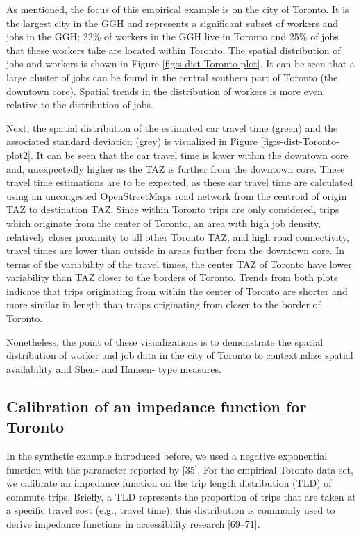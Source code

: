 \documentclass[10pt,letterpaper]{article}
\begin{document}
As mentioned, the focus of this empirical example is on the city of
Toronto. It is the largest city in the GGH and represents a significant
subset of workers and jobs in the GGH; 22\% of workers in the GGH live
in Toronto and 25\% of jobs that these workers take are located within
Toronto. The spatial distribution of jobs and workers is shown in Figure
\ref{fig:s-dist-Toronto-plot}. It can be seen that a large cluster of
jobs can be found in the central southern part of Toronto (the downtown
core). Spatial trends in the distribution of workers is more even
relative to the distribution of jobs.

Next, the spatial distribution of the estimated car travel time (green)
and the associated standard deviation (grey) is visualized in Figure
\ref{fig:s-dist-Toronto-plot2}. It can be seen that the car travel time
is lower within the downtown core and, unexpectedly higher as the TAZ is
further from the downtown core. These travel time estimations are to be
expected, as these car travel time are calculated using an uncongested
OpenStreetMaps road network from the centroid of origin TAZ to
destination TAZ. Since within Toronto trips are only considered, trips
which originate from the center of Toronto, an area with high job
density, relatively closer proximity to all other Toronto TAZ, and high
road connectivity, travel times are lower than outside in areas further
from the downtown core. In terms of the variability of the travel times,
the center TAZ of Toronto have lower variability than TAZ closer to the
borders of Toronto. Trends from both plots indicate that trips
originating from within the center of Toronto are shorter and more
similar in length than traips originating from closer to the border of
Toronto.

Nonetheless, the point of these visualizations is to demonstrate the
spatial distribution of worker and job data in the city of Toronto to
contextualize spatial availability and Shen- and Hansen- type measures.

\hypertarget{calibration-of-an-impedance-function-for-toronto}{%
\subsection{Calibration of an impedance function for
Toronto}\label{calibration-of-an-impedance-function-for-toronto}}

In the synthetic example introduced before, we used a negative
exponential function with the parameter reported by {[}35{]}. For the
empirical Toronto data set, we calibrate an impedance function on the
trip length distribution (TLD) of commute trips. Briefly, a TLD
represents the proportion of trips that are taken at a specific travel
cost (e.g., travel time); this distribution is commonly used to derive
impedance functions in accessibility research {[}69--71{]}.
\end{document}
